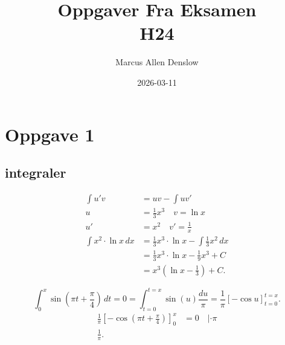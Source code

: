\documentclass{report}
\title{\Huge{Oppgaver Fra Eksamen}\\ H24}
\author{\Huge{Marcus Allen Denslow}}
\date{2026-03-11}
\begin{document}
\maketitle
\newpage%
\tableofcontents
\pagebreak

\chapter{Oppgave 1}
\section{integraler}


\sol
\begin{align*}
	\int  u'v                  & = uv - \int uv'                                             \\
	u                          & = \frac{1}{3}x^3 \quad v = \ln x                            \\
	u'                         & = x^2 \quad v' = \frac{1}{x}                                \\
	\int x^2 \cdot \ln x \, dx & = \frac{1}{3} x^{3} \cdot \ln x - \int \frac{1}{3}x^2 \, dx \\
	                           & = \frac{1}{3}x^3 \cdot \ln x - \frac{1}{9}x^3 + C           \\
	                           & = x^3 \left( \ln x - \frac{1}{3} \right) +C
	.\end{align*}

\sol
\begin{equation}
	\int_{0}^{x} \sin \left( \pi t + \frac{\pi}{4} \right)  \, dt = 0  = \int_{t = 0}^{t = x} \sin \left( u \right) \frac{du}{\pi} = \frac{1}{\pi} \left[ -\cos u \right]_{t = 0}^{t = x}
	.\end{equation}
\begin{align*}
	\frac{1}{\pi} \left[ -\cos \left( \pi t + \frac{\pi}{4} \right)  \right]_{0}^{x} & = 0 \quad | \cdot \pi \\
	\frac{1}{\pi}
	.\end{align*}
\end{document}
